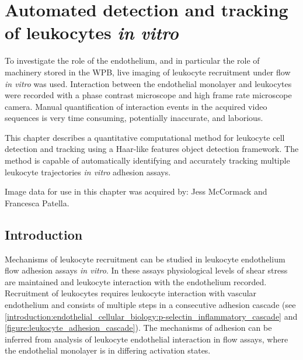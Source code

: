 \chapter{Automated detection and tracking of leukocytes \emph{in vitro}}
\label{leukocytes}
\ifpdf
    \graphicspath{{chapter_4/figs/}}
\fi


To investigate the role of the endothelium, and in particular the role of machinery stored in the WPB, live imaging of leukocyte recruitment under flow \emph{in vitro} was used. Interaction between the endothelial monolayer and leukocytes were recorded with a phase contrast microscope and high frame rate microscope camera. Manual quantification of interaction events in the acquired video sequences is very time consuming, potentially inaccurate, and laborious.

This chapter describes a quantitative computational method for leukocyte cell detection and tracking using a Haar-like features object detection framework. The method is capable of automatically identifying and accurately tracking multiple leukocyte trajectories \emph{in vitro} adhesion assays.

Image data for use in this chapter was acquired by: Jess McCormack and Francesca Patella.

\section{Introduction}
\label{leukocytes:introduction}
Mechanisms of leukocyte recruitment can be studied in leukocyte endothelium flow adhesion assays \emph{in vitro}. 
In these assays physiological levels of shear stress are maintained and leukocyte interaction with the endothelium recorded. Recruitment of leukocytes requires leukocyte interaction with vascular endothelium and consists of multiple steps in a consecutive adhesion cascade (see \autoref{introduction:endothelial_cellular_biology:p-selectin_inflammatory_cascade} and \autoref{figure:leukocyte_adhesion_cascade}). The mechanisms of adhesion can be inferred from analysis of leukocyte endothelial interaction in flow assays, where the endothelial monolayer is in differing activation states.

